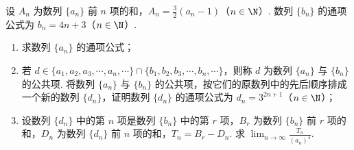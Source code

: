 \documentclass[UTF8,a4paper,oneside,11pt]{ctexbook}
\begin{document}
\begin{problem}
设 \(A_{n}\) 为数列 \(\{a_{n}\}\) 前 \(n\) 项的和，\(A_{n}=\frac{3}{2}(a_{n}-1)\)（\(n\in\N\)）. 数列 \(\{b_{n}\}\) 的通项公式为 \(b_{n}=4n+3\)（\(n\in\N\)）.

\begin{enumerate}
\item 求数列 \(\{a_{n}\}\) 的通项公式；
\item 若 \(d\in\{a_{1}, a_{2}, a_{3}, \cdots, a_{n}, \cdots\}\cap\{b_{1}, b_{2}, b_{3}, \cdots, b_{n}, \cdots\}\)，则称 \(d\) 为数列 \(\{a_{n}\}\) 与 \(\{b_{n}\}\) 的公共项. 将数列 \(\{a_{n}\}\) 与 \(\{b_{n}\}\) 的公共项，按它们的原数列中的先后顺序排成一个新的数列 \(\{d_{n}\}\)，证明数列 \(\{d_{n}\}\) 的通项公式为 \(d_{n}=3^{2n+1}\)（\(n\in\N\)）；
\item 设数列 \(\{d_{n}\}\) 中的第 \(n\) 项是数列 \(\{b_{n}\}\) 中的第 \(r\) 项，\(B_{r}\) 为数列 \(\{b_{n}\}\) 前 \(r\) 项的和，\(D_{n}\) 为数列 \(\{d_{n}\}\) 前 \(n\) 项的和，\(T_{n}=B_{r}-D_{n}\). 求 \(\displaystyle\lim_{n\to\infty}\frac{T_{n}}{(a_{n})^{4}}\).
\end{enumerate}
\end{problem}
\end{document}
